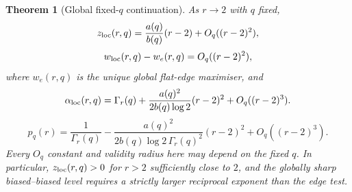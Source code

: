 \documentclass[11pt,reqno]{amsart}
\numberwithin{equation}{section}
\newtheorem{theorem}{Theorem}[section]
\theoremstyle{definition}
\theoremstyle{remark}
\begin{document}
\begin{theorem}[Global fixed-$q$ continuation]
As $r\to2$ with $q$ fixed,
\begin{equation}\label{eq:z-expansion}
  z_{\rm loc}(r,q)
  =\frac{a(q)}{b(q)}(r-2)+O_q((r-2)^2),
\end{equation}
\begin{equation}\label{eq:w-expansion}
  w_{\rm loc}(r,q)-w_e(r,q)=O_q((r-2)^2),
\end{equation}
where $w_e(r,q)$ is the unique global flat-edge maximiser, and
\begin{equation}\label{eq:alpha-expansion}
  \alpha_{\rm loc}(r,q)
  =\Gamma_r(q)
  +\frac{a(q)^2}{2b(q)\log2}(r-2)^2
  +O_q((r-2)^3).
\end{equation}
\begin{equation}\label{eq:p-expansion}
  p_q(r)
  =\frac1{\Gamma_r(q)}
  -\frac{a(q)^2}
  {2b(q)\log2\,\Gamma_r(q)^2}(r-2)^2
  +O_q((r-2)^3).
\end{equation}
Every $O_q$ constant and validity radius here may depend on the fixed $q$.
In particular, $z_{\rm loc}(r,q)>0$ for $r>2$ sufficiently close to $2$, and
the globally sharp biased--biased level requires a strictly larger reciprocal
exponent than the edge test.
\end{theorem}
\end{document}
